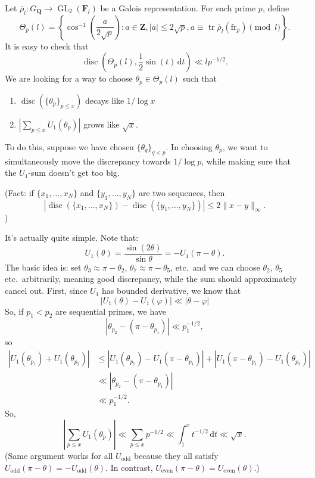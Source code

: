 \documentclass{article}
\DeclareMathOperator{\disc}{disc}
\DeclareMathOperator{\GL}{GL}
\DeclareMathOperator{\tr}{tr}
\newcommand{\bF}{\mathbf{F}}
\newcommand{\bQ}{\mathbf{Q}}
\newcommand{\bZ}{\mathbf{Z}}
\newcommand{\dd}{\mathrm{d}}
\newcommand{\even}{\mathrm{even}}
\newcommand{\fr}{\mathrm{fr}}
\newcommand{\odd}{\mathrm{odd}}
\begin{document}
Let $\bar\rho_l\colon G_\bQ \to \GL_2(\bF_l)$ be a Galois representation. For 
each prime $p$, define 
\[
	\Theta_p(l) = \left\{\cos^{-1}\left(\frac{a}{2\sqrt p}\right) : a\in \bZ, |a|\leqslant 2\sqrt p, a \equiv \tr \bar\rho_l(\fr_p)\pmod l\right\} .
\]
It is easy to check that 
\[
	\disc\left(\Theta_p(l),\frac 1 2 \sin(t)\, \dd t\right) \ll l p^{-1/2} .
\]
We are looking for a way to choose $\theta_p\in \Theta_p(l)$ such that 
\begin{enumerate}
\item
$\disc(\{\theta_p\}_{p\leqslant x})$ decays like $1/\log x$

\item
$\left| \sum_{p\leqslant x} U_1(\theta_p)\right|$ grows like 
$\sqrt x$. 
\end{enumerate}
To do this, suppose we have chosen $\{\theta_q\}_{q < p}$. In choosing 
$\theta_p$, we want to simultaneously move the discrepancy towards 
$1/\log p$, while making sure that the $U_1$-sum doesn't get too big. 

(Fact: if $\{x_1,\dots,x_N\}$ and $\{y_1,\dots,y_N\}$ are two sequences, 
then 
\[
	|\disc(\{x_1,\dots,x_N\}) - \disc(\{y_1,\dots,y_N\})| \leqslant 2\|x-y\|_\infty .
\]
)

It's actually quite simple. Note that:
\[
	U_1(\theta) = \frac{\sin(2\theta)}{\sin\theta} = -U_1(\pi-\theta) .
\]
The basic idea is: set $\theta_3 \approx \pi-\theta_2$, 
$\theta_7 \approx \pi-\theta_5$, etc.~and we can choose $\theta_2$, 
$\theta_5$ etc.~arbitrarily, meaning good discrepancy, while the sum should 
approximately cancel out. First, since $U_1$ has bounded derivative, we know 
that 
\[
	|U_1(\theta) - U_1(\varphi)| \ll |\theta-\varphi|
\]
So, if $p_1<p_2$ are sequential primes, we have 
\[
	|\theta_{p_2} - (\pi-\theta_{p_1})| \ll p_1^{-1/2} ,
\]
so 
\begin{align*}
	|U_1(\theta_{p_1}) + U_1(\theta_{p_2})| 
		&\leqslant |U_1(\theta_{p_1}) - U_1(\pi - \theta_{p_1})| + |U_1(\pi-\theta_{p_1}) - U_1(\theta_{p_2})| \\
		&\ll |\theta_{p_2} - (\pi-\theta_{p_1})| \\
		&\ll p_1^{-1/2} .
\end{align*}
So, 
\[
	\left| \sum_{p\leqslant x} U_1(\theta_p) \right| \ll \sum_{p\leqslant x} p^{-1/2} \ll \int_1^x t^{-1/2} \, \dd t \ll \sqrt x .
\]
(Same argument works for all $U_\odd$ because they all satisfy 
$U_\odd(\pi-\theta) = -U_\odd(\theta)$. In contrast, 
$U_\even(\pi-\theta) = U_\even(\theta)$.)
\end{document}

